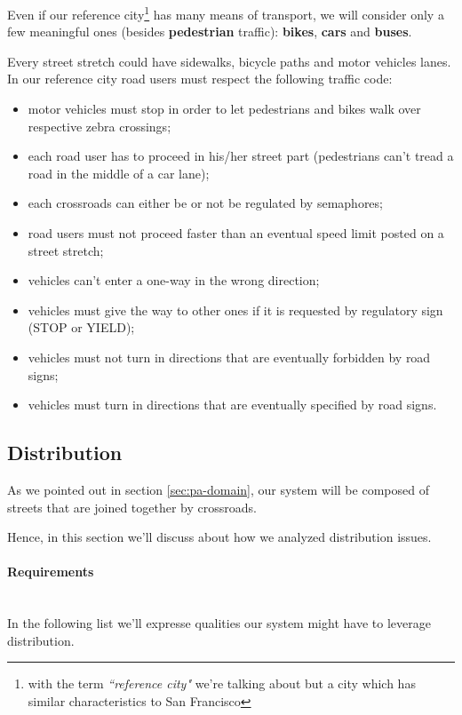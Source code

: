 Even if our reference city\footnote{with the term \emph{``reference city"}
we're talking about but a city which has similar characteristics to San
Francisco} has many means of transport, we will consider only a few meaningful
ones (besides \textbf{pedestrian} traffic): \textbf{bikes}, \textbf{cars} and
\textbf{buses}.

Every street stretch could have sidewalks, bicycle paths and motor vehicles
lanes. In our reference city road users must respect the following traffic
code:

\begin{itemize}
\item motor vehicles must stop in order to let pedestrians and bikes walk over
  respective zebra crossings;
\item each road user has to proceed in his/her street part (pedestrians can't
  tread a road in the middle of a car lane);
\item each crossroads can either be or not be regulated by semaphores;
\item road users must not proceed faster than an eventual speed limit posted
  on a street stretch;
\item vehicles can't enter a one-way in the wrong direction;
\item vehicles must give the way to other ones if it is requested by
  regulatory sign (STOP or YIELD);
\item vehicles must not turn in directions that are eventually forbidden by
  road signs;
\item vehicles must turn in directions that are eventually specified by road
  signs.
\end{itemize}

\subsection{Distribution}\label{sec:pa-distribution}
As we pointed out in section \ref{sec:pa-domain}, our system will be composed
of streets that are joined together by crossroads.

Hence, in this section we'll discuss about how we analyzed distribution issues.

\paragraph{Requirements} \mbox{} \\

In the following list we'll expresse qualities our system might have to
leverage distribution.

